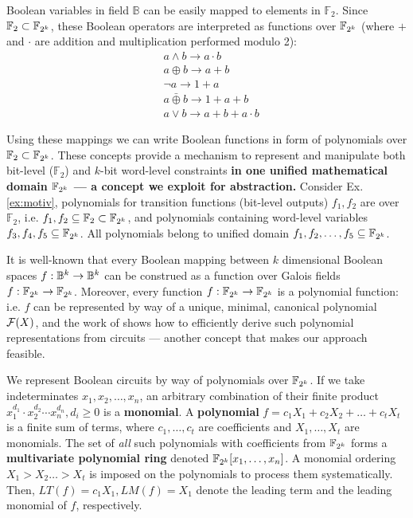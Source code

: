 Boolean variables in field $\mathbb B$ can be easily mapped to
elements in $\mathbb F_2$. Since $\mathbb F_2 \subset {\mathbb{F}}_{2^k}$, these 
Boolean operators are interpreted as functions over ${\mathbb{F}}_{2^k}$ (where $+$
and $\cdot$ are addition and multiplication performed modulo 2): 
\begin{align*}
&a\land b \to a\cdot b\\
&a\oplus b \to a+b\\
&\neg a \to 1+a\\
&a \bar{\oplus} b \to 1+a+b\\
&a \lor b \to a+b+a\cdot b
\end{align*}

Using these mappings we can write Boolean functions in form of
polynomials over $\mathbb F_2\subset {\mathbb{F}}_{2^k}$. 
These concepts provide a mechanism to represent and
manipulate both bit-level ($\mathbb{F}_2$) and $k$-bit word-level
constraints {\bf in one unified mathematical domain ${\mathbb{F}}_{2^k}$ --- a
  concept we   exploit for abstraction. }
  Consider Ex.\ref{ex:motiv},
polynomials for transition functions (bit-level outputs) $f_1,f_2$
are over $\mathbb F_2$, i.e. $f_1,f_2\subseteq \mathbb F_2 \subset {\mathbb{F}}_{2^k}$,
and polynomials containing word-level variables $f_3,f_4,f_5 \subseteq {\mathbb{F}}_{2^k}$.
All polynomials belong to unified domain $f_1,f_2,\dots,f_5 \subseteq {\mathbb{F}}_{2^k}$.

It is well-known that every Boolean mapping between $k$ dimensional
Boolean spaces $f: {\mathbb{B}}^k \rightarrow {\mathbb{B}}^k$ can be construed as a
function over Galois fields $f: {\mathbb{F}}_{2^k} \rightarrow {\mathbb{F}}_{2^k}$. Moreover,
every function $f: {\mathbb{F}}_{2^k} \rightarrow {\mathbb{F}}_{2^k}$ is a polynomial function: 
i.e. $f$ can be represented by way of a unique, minimal, canonical
polynomial ${\mathcal{F}}(X)$, and the work of \cite{timDAC} shows how to
efficiently derive such polynomial representations from circuits ---
another concept that makes our approach feasible. 


We represent Boolean circuits by way of polynomials over
${\mathbb{F}}_{2^k}$. If we take indeterminates $x_1,x_2,\dots,x_n$, an arbitrary
combination of their finite product  
$x_1^{d_1}\cdot x_2^{d_2}\cdots x_n^{d_n}, d_i\geq 0$ 
is a {\bf monomial}. A {\bf polynomial} $f = c_1 X_1 + c_2 X_2 + \dots
+ c_t X_t$ is a finite sum of terms, where $c_1, \dots, c_t$ are
coefficients and $X_1, \dots, X_t$ are monomials. The set of {\it all}
such polynomials with coefficients from ${\mathbb{F}}_{2^k}$ forms a {\bf
  multivariate polynomial ring} denoted ${\mathbb{F}}_{2^k}[x_1,\dots,x_n]$. 
A monomial ordering $X_1 > X_2 \dots > X_t$ is imposed on the
polynomials to process them systematically. Then, $LT(f) = c_1 X_1,
LM(f) = X_1$ denote the leading term and the leading monomial of $f$,
respectively. 


